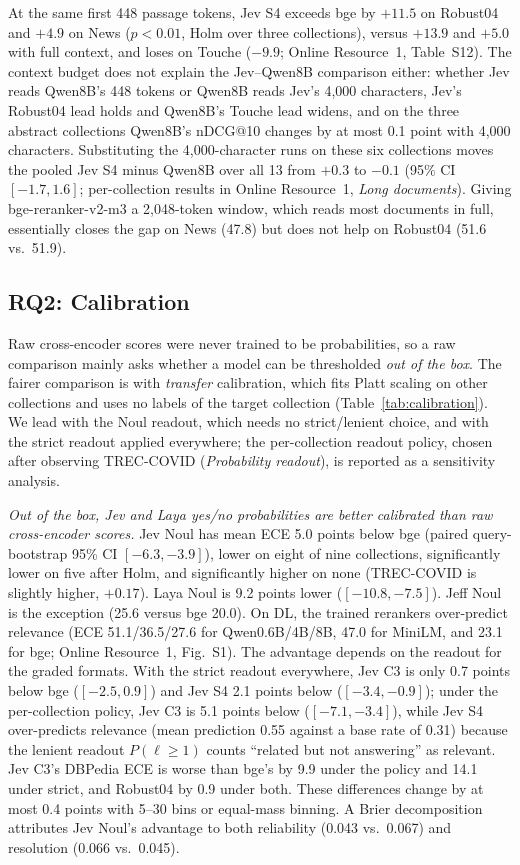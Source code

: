 At the same first 448 passage tokens, Jev S4 exceeds bge by $+11.5$ on Robust04 and $+4.9$ on News ($p<0.01$, Holm over three collections), versus $+13.9$ and $+5.0$ with full context, and loses on Touche ($-9.9$; Online Resource~1, Table~S12). The context budget does not explain the Jev--Qwen8B comparison either: whether Jev reads Qwen8B's 448 tokens or Qwen8B reads Jev's 4{,}000 characters, Jev's Robust04 lead holds and Qwen8B's Touche lead widens, and on the three abstract collections Qwen8B's nDCG@10 changes by at most 0.1 point with 4{,}000 characters. Substituting the 4{,}000-character runs on these six collections moves the pooled Jev S4 minus Qwen8B over all 13 from $+0.3$ to $-0.1$ (95\% CI $[-1.7,1.6]$; per-collection results in Online Resource~1, \emph{Long documents}).
Giving bge-reranker-v2-m3 a 2{,}048-token window, which reads most documents in full, essentially closes the gap on News (47.8) but does not help on Robust04 (51.6 vs.\ 51.9).




\subsection{RQ2: Calibration}

Raw cross-encoder scores were never trained to be probabilities, so a raw comparison mainly asks whether a model can be thresholded \emph{out of the box}. The fairer comparison is with \emph{transfer} calibration, which fits Platt scaling on other collections and uses no labels of the target collection (Table~\ref{tab:calibration}). We lead with the Noul readout, which needs no strict/lenient choice, and with the strict readout applied everywhere; the per-collection readout policy, chosen after observing TREC-COVID (\emph{Probability readout}), is reported as a sensitivity analysis.

\emph{Out of the box, Jev and Laya yes/no probabilities are better calibrated than raw cross-encoder scores.}
Jev Noul has mean ECE 5.0 points below bge (paired query-bootstrap 95\% CI $[-6.3,-3.9]$), lower on eight of nine collections, significantly lower on five after Holm, and significantly higher on none (TREC-COVID is slightly higher, $+0.17$). Laya Noul is 9.2 points lower ($[-10.8,-7.5]$). Jeff Noul is the exception (25.6 versus bge 20.0). On DL, the trained rerankers over-predict relevance (ECE 51.1/36.5/27.6 for Qwen0.6B/4B/8B, 47.0 for MiniLM, and 23.1 for bge; Online Resource~1, Fig.~S1).
The advantage depends on the readout for the graded formats. With the strict readout everywhere, Jev C3 is only 0.7 points below bge ($[-2.5,0.9]$) and Jev S4 2.1 points below ($[-3.4,-0.9]$); under the per-collection policy, Jev C3 is 5.1 points below ($[-7.1,-3.4]$), while Jev S4 over-predicts relevance (mean prediction 0.55 against a base rate of 0.31) because the lenient readout $P(\ell\ge1)$ counts ``related but not answering'' as relevant. Jev C3's DBPedia ECE is worse than bge's by 9.9 under the policy and 14.1 under strict, and Robust04 by 0.9 under both.
These differences change by at most 0.4 points with 5--30 bins or equal-mass binning. A Brier decomposition attributes Jev Noul's advantage to both reliability (0.043 vs.\ 0.067) and resolution (0.066 vs.\ 0.045).

